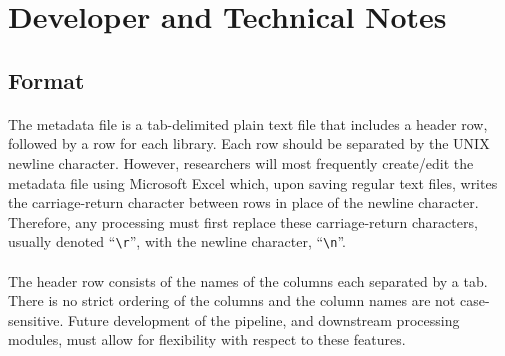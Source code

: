 \documentclass{article}
\begin{document}
\section{Developer and Technical Notes}
\subsection*{Format}
\paragraph{} The metadata file is a tab-delimited plain text file that includes a header row, followed by a row for each library. Each row should be separated by the UNIX newline character. However, researchers will most frequently create/edit the metadata file using Microsoft Excel which, upon saving regular text files, writes the carriage-return character between rows in place of the newline character. Therefore, any processing must first replace these carriage-return characters, usually denoted ``\texttt{\textbackslash{}r}'', with the newline character, ``\texttt{\textbackslash{}n}''.
\paragraph{} The header row consists of the names of the columns each separated by a tab. There is no strict ordering of the columns and the column names are not case-sensitive. Future development of the pipeline, and downstream processing modules, must allow for flexibility with respect to these features.
\end{document}
